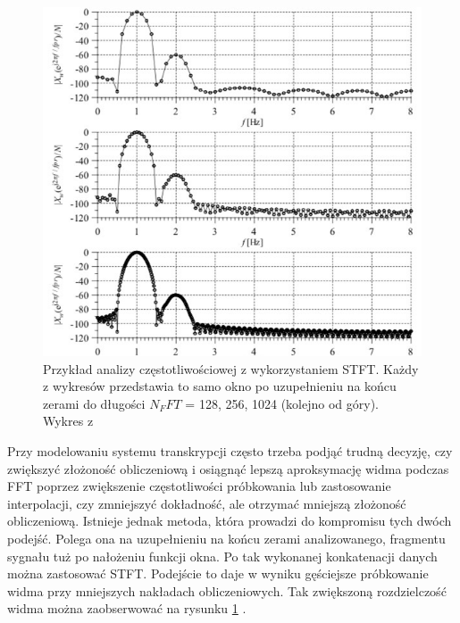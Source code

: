 \documentclass[12pt,a4paper,twoside]{mwart}
\begin{document}
\begin{figure}[t]
  \begin{center}
    \includegraphics[scale=0.7]{images/ZeroPadding.jpg}
    \caption{Przykład analizy częstotliwościowej z wykorzystaniem STFT. Każdy z wykresów przedstawia to samo okno po uzupełnieniu na końcu zerami do długości $N_FFT$ = 128, 256, 1024 (kolejno od góry). Wykres z \cite[224]{CyfrowePrzetwarzanieSygnalowOdTeoriiDoZastosowan}}
    \label{fig:ZeroPadding}
  \end{center}
\end{figure}

Przy modelowaniu systemu transkrypcji często trzeba podjąć trudną decyzję, czy zwiększyć złożoność obliczeniową i osiągnąć lepszą aproksymację widma podczas FFT poprzez zwiększenie częstotliwości próbkowania lub zastosowanie interpolacji, czy zmniejszyć dokładność, ale otrzymać mniejszą złożoność obliczeniową. Istnieje jednak metoda, która prowadzi do kompromisu tych dwóch podejść. Polega ona na uzupełnieniu na końcu zerami analizowanego, fragmentu sygnału tuż po nałożeniu funkcji okna. Po tak wykonanej konkatenacji danych można zastosować STFT. Podejście to daje w wyniku gęściejsze próbkowanie widma przy mniejszych nakładach obliczeniowych. Tak zwiększoną rozdzielczość widma można zaobserwować na rysunku \ref{fig:ZeroPadding} \cite[221-224]{CyfrowePrzetwarzanieSygnalowOdTeoriiDoZastosowan}.

\clearpage
\end{document}
